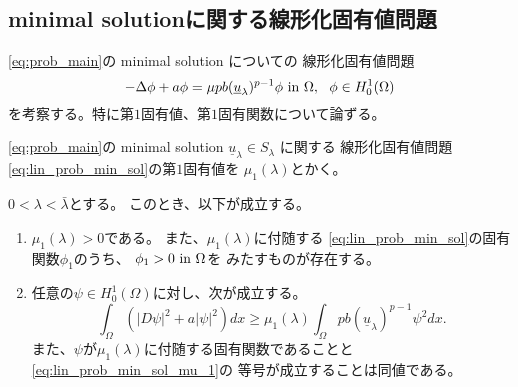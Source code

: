 \subsection{minimal solutionに関する線形化固有値問題}

\ref{eq:prob_main}の minimal solution についての
線形化固有値問題
\begin{equation}
 -\Delta \phi + a \phi = \mu p b (\underline{u}_\lambda)^{p-1} \phi
  ~\text{in}~ \Omega, \ \ \phi \in H_0^1(\Omega) \label{eq:lin_prob_min_sol}
\end{equation}
を考察する。特に第$1$固有値、第$1$固有関数について論ずる。

\begin{nota}
 \ref{eq:prob_main}の
 minimal solution $\underline{u}_\lambda \in S_\lambda$ に関する
 線形化固有値問題\eqref{eq:lin_prob_min_sol}の第$1$固有値を
 $\mu_1(\lambda)$とかく。
\end{nota}

\begin{lem} \label{lem:lin_p}
 $0 < \lambda < \bar{\lambda}$とする。
 このとき、以下が成立する。
 \begin{enumerate}[1.] \sage
  \item $\mu_1(\lambda) > 0$である。
        また、$\mu_1(\lambda)$に付随する
        \eqref{eq:lin_prob_min_sol}の固有関数$\phi_1$のうち、
        $\phi_1 > 0 ~\text{in}~ \Omega$を
        みたすものが存在する。
  \item 任意の$\psi \in H_0^1(\Omega)$に対し、次が成立する。
        \begin{equation}
         \int_\Omega \left( \lvert D\psi \rvert^2 + a \lvert \psi
                      \rvert^2 \right)
          dx \geq \mu_1(\lambda) \int_\Omega pb(\underline{u}_\lambda)^{p-1}
          \psi^2 dx. \label{eq:lin_prob_min_sol_mu_1}
        \end{equation}
        また、$\psi$が$\mu_1(\lambda)$に付随する固有関数であることと
        \eqref{eq:lin_prob_min_sol_mu_1}の
        等号が成立することは同値である。
 \end{enumerate}
\end{lem}

